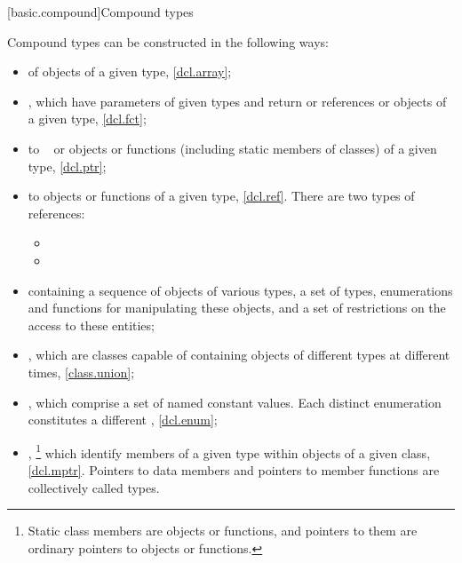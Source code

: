 [basic.compound]{Compound types}

\pnum
{}%
Compound types can be constructed in the following ways:
\begin{itemize}
\item {} of objects of a given type, \ref{dcl.array};

\item {}, which have parameters of given types and return
 or references or objects of a given type, \ref{dcl.fct};

\item {} to \cv{}~ or objects or functions (including
static members of classes) of a given type, \ref{dcl.ptr};

\item %
%
%
 to objects or functions of a given
type, \ref{dcl.ref}. There are two types of references:
\begin{itemize}
\item {}
\item {}
\end{itemize}

\item
{} containing a sequence of objects of various types,
a set of types, enumerations and functions for
manipulating these objects, and a set of restrictions
on the access to these entities;

\item
{}, which are classes capable of containing objects of
different types at different times, \ref{class.union};

\item
{}, which comprise a set of named constant values.
Each distinct enumeration constitutes a different
, \ref{dcl.enum};

\item {}%
,%
\footnote{Static class members are objects or functions, and pointers to them are
ordinary pointers to objects or functions.}
which identify members of a given
type within objects of a given class, \ref{dcl.mptr}.
Pointers to data members and pointers to member functions are collectively
called  types.
\end{itemize}

